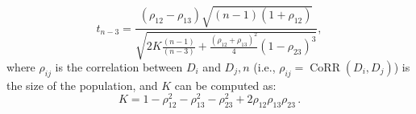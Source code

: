 \begin{equation*}\label{eqSteiger}
t_{n-3}=\frac{\left(\rho_{12}-\rho_{13}\right) \sqrt{(n-1)\left(1+\rho_{12}\right)}}{\sqrt{2 K \frac{(n-1)}{(n-3)}+\frac{\left(\rho_{12}+\rho_{13}\right)^2}{4}\left(1-\rho_{23}\right)^3}},
\end{equation*}
where $\rho_{i j}$ is the correlation between $D_i$ and $D_j, n$ (i.e., $\rho_{i j}=\operatorname{CoRR}(D_i,D_j)$) is the size of the population, and $K$ can be computed as:
$$
K=1-\rho_{12}^2-\rho_{13}^2-\rho_{23}^2+2 \rho_{12} \rho_{13} \rho_{23}\, .
$$




